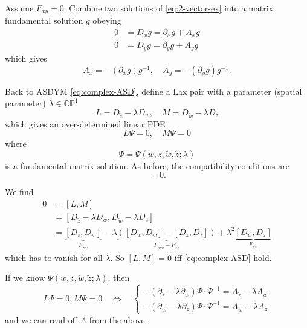 \documentclass[a4paper,11pt]{article}
\begin{document}
\begin{aside}
    Assume $F_{xy} = 0$. Combine two solutions of \eqref{eq:2-vector-ex} into a matrix fundamental solution $g$ obeying
    \begin{equation}
        \begin{split}
            0 & = D_x g = \partial_x g + A_x g\\
            0 & = D_y g = \partial_y g + A_y g
        \end{split}
    \end{equation}
    which gives  
    \begin{equation}
        A_x = - (\partial_x g) g^{-1}, \quad A_y = - (\partial_y g) g^{-1}.
    \end{equation}
    \end{aside}

    Back to ASDYM \eqref{eq:complex-ASD}, define a Lax pair with a parameter (spatial parameter) $\lambda \in \mathbb{CP}^1$ 
    \begin{equation}
        L = D_{\tilde z} - \lambda D_w, \quad M = D_{\tilde w} - \lambda D_z
    \end{equation}
    which gives an over-determined linear PDE 
    \begin{equation}
        L \Psi = 0,\quad M \Psi = 0
    \end{equation}
    where 
    \begin{equation}
        \Psi = \Psi(w,z,\tilde w, \tilde z; \lambda)
    \end{equation} 
    is a fundamental matrix solution. As before, the compatibility conditions are 
    \begin{equation}
        [L, M] = 0.
    \end{equation}
    
    We find 
    \begin{equation}
        \begin{split}
            0 & = [L,M]\\
            & = [D_{\tilde z} - \lambda D_w, D_{\tilde w} - \lambda D_z] \\
            & = \underbrace{[D_{\tilde z}, D_{\tilde w}]}_{F_{\tilde z \tilde w}} - \lambda \underbrace{\left( [D_w, D_{\tilde w}] - [D_z, D_{\tilde z}] \right)}_{F_{w \tilde w} - F_{z \tilde z}} + \lambda^2 \underbrace{[D_w, D_z]}_{F_{wz}}
        \end{split}
    \end{equation}
    which has to vanish for all $\lambda$. So $[L,M] = 0$ iff \eqref{eq:complex-ASD} hold. 

    If we know $\Psi(w,z,\tilde w, \tilde z; \lambda)$, then 
    \begin{equation}
        L \Psi = 0, M \Psi = 0 \quad \Leftrightarrow \quad \begin{cases}
            - (\partial_{\tilde z} - \lambda \partial_w) \Psi \cdot \Psi^{-1} = A_{\tilde z} - \lambda A_w\\
            - (\partial_{\tilde w} - \lambda \partial_z) \Psi \cdot \Psi^{-1} = A_{\tilde w} - \lambda A_z
        \end{cases}
    \end{equation}
    and we can read off $A$ from the above.
\end{document}
